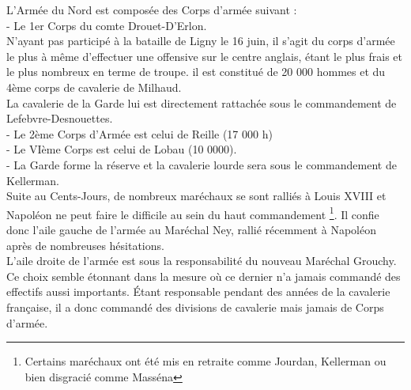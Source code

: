 L'Armée du Nord est composée des Corps d'armée suivant :  \\


- Le 1er Corps du comte Drouet-D'Erlon.\\

N'ayant pas participé à la bataille de Ligny le 16 juin, il s'agit du corps d'armée le plus à même 
d'effectuer une offensive sur le centre anglais, étant le plus frais et le plus nombreux en terme de troupe. il est constitué de 20 000 hommes et du 4ème corps de cavalerie de Milhaud.\\
La cavalerie de la Garde lui est directement rattachée sous le commandement de  Lefebvre-Desnouettes.\\


- Le 2ème Corps d'Armée est celui de Reille (17 000 h)\\

- Le VIème Corps est celui de Lobau (10 0000).\\

- La Garde forme la réserve et la cavalerie lourde sera sous le commandement de Kellerman.\\

Suite au Cents-Jours, de nombreux maréchaux se sont ralliés à Louis XVIII et Napoléon ne peut faire le 
difficile au sein du haut commandement \footnote{Certains maréchaux ont été mis en retraite comme Jourdan, Kellerman ou bien disgracié comme Masséna}. Il confie donc l'aile gauche de l'armée au Maréchal Ney, rallié 
récemment à Napoléon après de nombreuses hésitations.\\
L'aile droite de l'armée est sous la responsabilité du nouveau Maréchal Grouchy. 
Ce choix semble étonnant dans la mesure où ce dernier n'a jamais commandé des effectifs aussi importants. 
Étant responsable pendant des années de la cavalerie française, il a donc commandé des divisions de 
cavalerie mais jamais de Corps d'armée. \\


